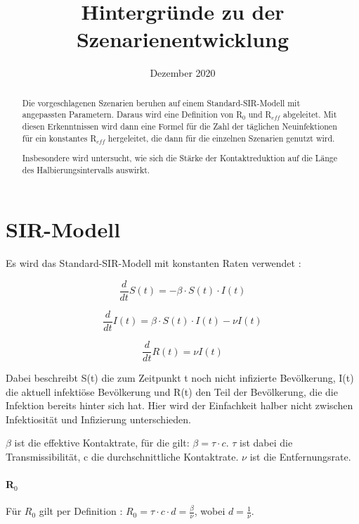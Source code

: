 \documentclass[a4paper]{article}
\title{Hintergründe zu der Szenarienentwicklung}
\date{Dezember 2020}
\begin{document}
    
    \maketitle
    \begin{abstract}
        Die vorgeschlagenen Szenarien beruhen auf einem Standard-SIR-Modell mit angepassten Parametern. Daraus wird eine Definition von R$_0$ und R$_{eff}$ abgeleitet. Mit diesen Erkenntnissen wird dann eine Formel für die Zahl der täglichen Neuinfektionen für ein konstantes R$_{eff}$ hergeleitet, die dann für die einzelnen Szenarien genutzt wird. 

        Insbesondere wird untersucht, wie sich die Stärke der Kontaktreduktion auf die Länge des Halbierungsintervalls auswirkt.
    \end{abstract}

    \section{SIR-Modell}
    \paragraph{}Es wird das Standard-SIR-Modell mit konstanten Raten verwendet \cite{jonesOnR0}: 

    \begin{equation}
        \frac{d}{dt} S(t) = - \beta \cdot S(t) \cdot I(t)
    \end{equation}

    \begin{equation}
        \frac{d}{dt} I(t) = \beta \cdot S(t) \cdot I(t) - \nu I(t)
    \end{equation}

    \begin{equation}
        \frac{d}{dt} R(t) = \nu I(t)
    \end{equation}

    Dabei beschreibt S(t) die zum Zeitpunkt t noch nicht infizierte Bevölkerung, I(t) die aktuell infektiöse Bevölkerung und R(t) den Teil der Bevölkerung, die die Infektion bereits hinter sich hat. Hier wird der Einfachkeit halber nicht zwischen Infektiosität und Infizierung unterschieden. 

    $\beta$ ist die effektive Kontaktrate, für die gilt: $ \beta = \tau \cdot c $. $\tau$ ist dabei die Transmissibilität, c die durchschnittliche Kontaktrate. $\nu$ ist die Entfernungsrate.

    \paragraph{R$_0$} Für $R_0$ gilt per Definition \cite{jonesOnR0}: $R_0 = \tau \cdot c \cdot d = \frac{\beta}{\nu}$, wobei $d = \frac{1}{\nu}$. 
    
\end{document}
